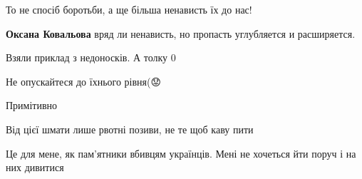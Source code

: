 \begin{itemize}
 
То не спосіб боротьби, а ще більша ненависть їх до нас!

\begin{itemize}
 
\textbf{Оксана Ковальова} вряд ли ненависть, но пропасть углубляется и расширяется.
\end{itemize}

 
Взяли приклад з недоносків. А толку 0


 
Не опускайтеся до їхнього рівня(😟

 
Примітивно

Від цієї шмати лише рвотні позиви, не те щоб каву пити

 
Це для мене, як пам'ятники вбивцям українців. Мені не хочеться йти поруч і на них дивитися


 

\end{itemize}
